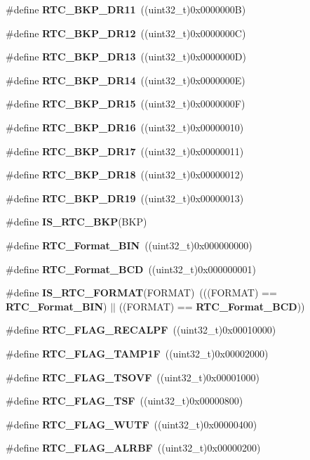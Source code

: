 \begin{DoxyCompactItemize}
\item 
\#define \textbf{ R\+T\+C\+\_\+\+B\+K\+P\+\_\+\+D\+R11}~((uint32\+\_\+t)0x0000000\+B)
\item 
\#define \textbf{ R\+T\+C\+\_\+\+B\+K\+P\+\_\+\+D\+R12}~((uint32\+\_\+t)0x0000000\+C)
\item 
\#define \textbf{ R\+T\+C\+\_\+\+B\+K\+P\+\_\+\+D\+R13}~((uint32\+\_\+t)0x0000000\+D)
\item 
\#define \textbf{ R\+T\+C\+\_\+\+B\+K\+P\+\_\+\+D\+R14}~((uint32\+\_\+t)0x0000000\+E)
\item 
\#define \textbf{ R\+T\+C\+\_\+\+B\+K\+P\+\_\+\+D\+R15}~((uint32\+\_\+t)0x0000000\+F)
\item 
\#define \textbf{ R\+T\+C\+\_\+\+B\+K\+P\+\_\+\+D\+R16}~((uint32\+\_\+t)0x00000010)
\item 
\#define \textbf{ R\+T\+C\+\_\+\+B\+K\+P\+\_\+\+D\+R17}~((uint32\+\_\+t)0x00000011)
\item 
\#define \textbf{ R\+T\+C\+\_\+\+B\+K\+P\+\_\+\+D\+R18}~((uint32\+\_\+t)0x00000012)
\item 
\#define \textbf{ R\+T\+C\+\_\+\+B\+K\+P\+\_\+\+D\+R19}~((uint32\+\_\+t)0x00000013)
\item 
\#define \textbf{ I\+S\+\_\+\+R\+T\+C\+\_\+\+B\+KP}(B\+KP)
\item 
\#define \textbf{ R\+T\+C\+\_\+\+Format\+\_\+\+B\+IN}~((uint32\+\_\+t)0x000000000)
\item 
\#define \textbf{ R\+T\+C\+\_\+\+Format\+\_\+\+B\+CD}~((uint32\+\_\+t)0x000000001)
\item 
\#define \textbf{ I\+S\+\_\+\+R\+T\+C\+\_\+\+F\+O\+R\+M\+AT}(F\+O\+R\+M\+AT)~(((F\+O\+R\+M\+AT) == \textbf{ R\+T\+C\+\_\+\+Format\+\_\+\+B\+IN}) $\vert$$\vert$ ((F\+O\+R\+M\+AT) == \textbf{ R\+T\+C\+\_\+\+Format\+\_\+\+B\+CD}))
\item 
\#define \textbf{ R\+T\+C\+\_\+\+F\+L\+A\+G\+\_\+\+R\+E\+C\+A\+L\+PF}~((uint32\+\_\+t)0x00010000)
\item 
\#define \textbf{ R\+T\+C\+\_\+\+F\+L\+A\+G\+\_\+\+T\+A\+M\+P1F}~((uint32\+\_\+t)0x00002000)
\item 
\#define \textbf{ R\+T\+C\+\_\+\+F\+L\+A\+G\+\_\+\+T\+S\+O\+VF}~((uint32\+\_\+t)0x00001000)
\item 
\#define \textbf{ R\+T\+C\+\_\+\+F\+L\+A\+G\+\_\+\+T\+SF}~((uint32\+\_\+t)0x00000800)
\item 
\#define \textbf{ R\+T\+C\+\_\+\+F\+L\+A\+G\+\_\+\+W\+U\+TF}~((uint32\+\_\+t)0x00000400)
\item 
\#define \textbf{ R\+T\+C\+\_\+\+F\+L\+A\+G\+\_\+\+A\+L\+R\+BF}~((uint32\+\_\+t)0x00000200)
$$
\end{DoxyCompactItemize}
